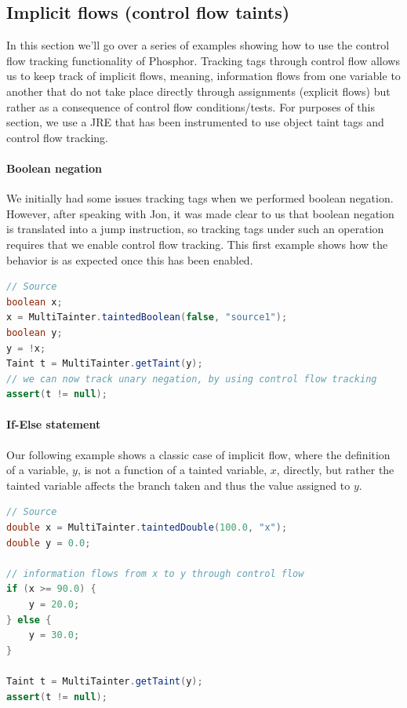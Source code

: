 \documentclass[a4paper]{article}
\begin{document}
\subsection{Implicit flows (control flow taints)}
In this section we'll go over a series of examples showing how to use the
control flow tracking functionality of Phosphor. Tracking tags through control flow allows
us to keep track of implicit flows, meaning, information flows from one variable to another
that do not take place directly through assignments (explicit flows) but rather as a consequence
of control flow conditions/tests. For purposes of this section, we use a JRE that has been
instrumented to use object taint tags and control flow tracking.

\paragraph{Boolean negation}
We initially had some issues tracking tags when we performed boolean negation. However,
after speaking with Jon, it was made clear to us that boolean negation is translated into
a jump instruction, so tracking tags under such an operation requires that we enable control flow
tracking. This first example shows how the behavior is as expected once this has been enabled.

\begin{lstlisting}[language=java]
// Source
boolean x;
x = MultiTainter.taintedBoolean(false, "source1");
boolean y;
y = !x;
Taint t = MultiTainter.getTaint(y);
// we can now track unary negation, by using control flow tracking
assert(t != null);
\end{lstlisting}


\paragraph{If-Else statement}
Our following example shows a classic case of implicit flow, where the definition of a variable, $y$,
is not a function of a tainted variable, $x$, directly, but rather the tainted variable affects the
branch taken and thus the value assigned to $y$.

\begin{lstlisting}[language=java]
// Source
double x = MultiTainter.taintedDouble(100.0, "x");
double y = 0.0;

// information flows from x to y through control flow
if (x >= 90.0) {
    y = 20.0;
} else {
    y = 30.0;
}

Taint t = MultiTainter.getTaint(y);
assert(t != null);
\end{lstlisting}
\end{document}
